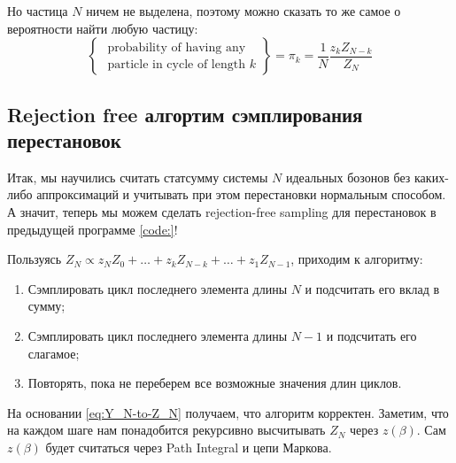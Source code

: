 Но частица $N$ ничем не выделена, поэтому можно сказать то же самое о вероятности найти любую частицу:
\begin{equation}
    \label{eq:probability-to-find-any-particle-at-cycle_k}
    \left\{\begin{array}{l}\text { probability of having any } \\ \text { particle in cycle of length } k\end{array}\right\}=\pi_{k}=\frac{1}{N} \frac{z_{k} Z_{N-k}}{Z_{N}}
\end{equation}

\subsection{Rejection free алгортим сэмплирования перестановок}

Итак, мы научились считать статсумму системы $N$ идеальных бозонов без каких-либо аппроксимаций и учитывать при этом перестановки нормальным способом.
А значит, теперь мы можем сделать rejection-free sampling для перестановок в предыдущей программе \ref{code:}!

Пользуясь $Z_{N} \propto z_{N} Z_{0}+\ldots+z_{k} Z_{N-k}+\ldots+z_{1} Z_{N-1}$, приходим к алгоритму:
\begin{enumerate}
    \item Сэмплировать цикл последнего элемента длины $N$ и подсчитать его вклад в сумму;
    \item Сэмплировать цикл последнего элемента длины $N-1$ и подсчитать его слагамое;
    \item Повторять, пока не переберем все возможные значения длин циклов.
\end{enumerate}
На основании \eqref{eq:Y_N-to-Z_N} получаем, что алгоритм корректен.
Заметим, что на каждом шаге нам понадобится рекурсивно высчитывать $Z_N$ через $z(\beta)$.
Сам $z(\beta)$ будет считаться через Path Integral и цепи Маркова.


